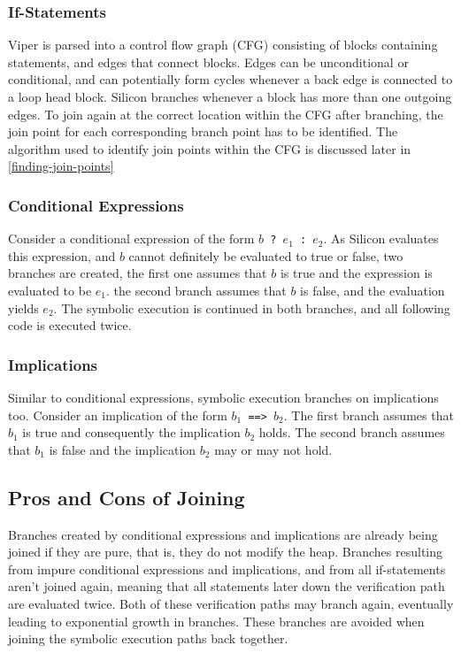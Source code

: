 \documentclass[11pt]{article}
\begin{document}
    \subsubsection{If-Statements} \label{if-statements}

    Viper is parsed into a control flow graph (CFG) consisting of blocks containing
    statements, and edges that connect blocks. Edges can be unconditional or conditional,
    and can potentially form cycles whenever a back edge is connected to a loop head block.
    Silicon branches whenever a block has more than one outgoing edges.
    To join again at the correct location within the CFG after branching,
    the join point for each corresponding branch point has to be identified.
    The algorithm used to identify join points within the CFG is discussed later in
    \ref{finding-join-points}

    \subsubsection{Conditional Expressions}

    Consider a conditional expression of the form \texttt{$b$ ? $e_1$ : $e_2$}.
    As Silicon evaluates this expression, and $b$ cannot definitely be evaluated to true or false,
    two branches are created, the first one assumes that $b$
    is true and the expression is evaluated to be $e_1$.
    the second branch assumes that $b$ is false, and the evaluation yields $e_2$.
    The symbolic execution is continued in both branches, and all following code
    is executed twice.


    \subsubsection{Implications}

    Similar to conditional expressions, symbolic execution branches on implications too. Consider
    an implication of the form \texttt{$b_1$ ==> $b_2$}. The first branch assumes that $b_1$ is true and
    consequently the implication $b_2$ holds. The second branch assumes that $b_1$ is false and the
    implication $b_2$ may or may not hold. 

    \subsection{Pros and Cons of Joining}

    Branches created by conditional expressions and implications are already being joined if they are pure,
    that is, they do not modify the heap.
    Branches resulting from impure conditional expressions and implications,
    and from all if-statements aren't joined again, meaning that
    all statements later down the verification path are evaluated twice. Both of these
    verification paths may branch again, eventually leading to exponential growth in branches.
    These branches are avoided when joining the symbolic execution paths back together.
\end{document}
